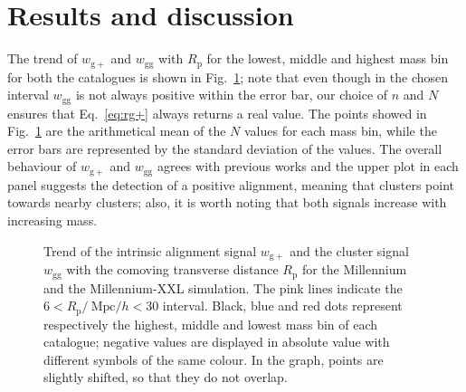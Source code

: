 \documentclass[a4paper,fleqn,usenatbib]{mnras}
\begin{document}
\section{Results and discussion}
\label{sec:resanddiscuss}
The trend of $w_{\mathrm{g+}}$ and $w_{\mathrm{gg}}$ with $R_{\mathrm{p}}$ for the lowest, middle and highest mass bin for both the catalogues is shown in Fig.~\ref{fig:wgpwggrp}; note that even though in the chosen interval $w_{\mathrm{gg}}$ is not always positive within the error bar, our choice of $n$ and $N$ ensures that Eq.~\ref{eq:rg+} always returns a real value. The points showed in Fig.~\ref{fig:wgpwggrp} are the arithmetical mean of the $N$ values for each mass bin, while the error bars are represented by the standard deviation of the values.
The overall behaviour of $w_{\mathrm{g+}}$ and $w_{\mathrm{gg}}$ agrees with previous works \citep{Joachimietal2011, vanUitertJoachimi2017} and the upper plot in each panel suggests the detection of a positive alignment, meaning that clusters point towards nearby clusters; also, it is worth noting that both signals increase with increasing mass.
\begin{figure}
	\centerline{
	}
	\centerline{
	}
	\caption{Trend of the intrinsic alignment signal $w_{\mathrm{g+}}$ and the cluster signal $w_{\mathrm{gg}}$ with the comoving transverse distance $R_{\mathrm{p}}$ for \protect{} the Millennium and \protect{} the Millennium-XXL simulation. The pink lines indicate the $6 < R_{\mathrm{p}} / \ \mbox{Mpc}/h < 30 $ interval. Black, blue and red dots represent respectively the highest, middle and lowest mass bin of each catalogue; negative values are displayed in absolute value with different symbols of the same colour. In the graph, points are slightly shifted, so that they do not overlap.}
	\label{fig:wgpwggrp}
\end{figure}
\end{document}

